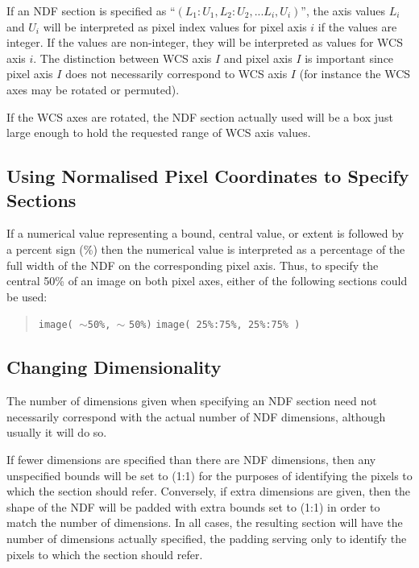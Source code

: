 \documentclass[twoside,11pt,nolof]{starlink}
\providecommand{\hi}[1]{{\texttt{#1}}}
\begin{document}
If an NDF section is specified as ``$(L_{1}:U_{1},L_{2}:U_{2},  ...  L_{i},U_{i})$'',
the axis values $L_{i}$ and $U_{i}$ will be interpreted as pixel index
values for pixel axis $i$ if the values are integer. If the values are
non-integer, they will be interpreted as values for WCS axis $i$. The
distinction between WCS axis $I$ and pixel axis $I$ is important since
pixel axis $I$ does not necessarily correspond to WCS axis $I$ (for
instance the WCS axes may be rotated or permuted).

If the WCS axes are rotated, the NDF section actually used will be a box
just large enough to hold the requested range of WCS axis values.


\subsection{Using Normalised Pixel Coordinates to Specify Sections}
If a numerical value representing a bound, central value, or extent is
followed by a percent sign (\%) then the numerical value is
interpreted as a percentage of the full width of the NDF on the
corresponding pixel axis. Thus, to specify the central 50\% of an image
on both pixel axes, either of the following sections could be used:

\small
\begin{quote}
\begin{center}
\hi{image( }$\sim$\hi{50\%, }$\sim$ \hi{50\%)}\newline
\hi{image( 25\%:75\%, 25\%:75\% )}
\end{center}
\end{quote}
\normalsize


\subsection{Changing Dimensionality}

The number of dimensions given when specifying an NDF section need not
necessarily correspond with the actual number of NDF dimensions, although
usually it will do so.

If fewer dimensions are specified than there are NDF dimensions, then any
unspecified bounds will be set to (1:1) for the purposes of identifying the
pixels to which the section should refer. Conversely, if extra dimensions are
given, then the shape of the NDF will be padded with extra bounds set
to (1:1) in order to match the number of dimensions. In all cases, the
resulting section will have the number of dimensions actually
specified, the padding serving only to identify the pixels to which
the section should refer.
\end{document}
